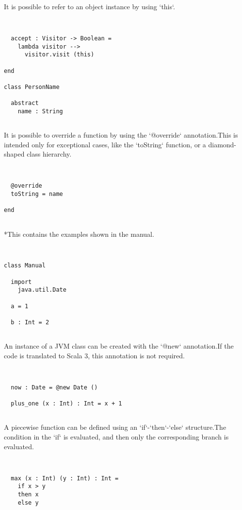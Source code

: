 \documentclass[12pt,a4paper]{article}
\begin{document}
It is possible to refer to an object instance by using `this`. 


\begin{lstlisting}


  accept : Visitor -> Boolean =
    lambda visitor -->
      visitor.visit (this)

end

class PersonName

  abstract
    name : String


\end{lstlisting}

It is possible to override a function by using the `@override` annotation.This is intended only for exceptional cases, like the `toString` function, or a diamond-shaped class hierarchy. 


\begin{lstlisting}


  @override
  toString = name

end


\end{lstlisting}

  *This contains the examples shown in the manual.


\begin{lstlisting}


class Manual

  import
    java.util.Date

  a = 1

  b : Int = 2


\end{lstlisting}

An instance of a JVM class can be created with the `@new` annotation.If the code is translated to Scala 3, this annotation is not required. 


\begin{lstlisting}


  now : Date = @new Date ()

  plus_one (x : Int) : Int = x + 1


\end{lstlisting}

A piecewise function can be defined using an `if`-`then`-`else` structure.The condition in the `if` is evaluated, and then only the corresponding branch is evaluated. 


\begin{lstlisting}


  max (x : Int) (y : Int) : Int =
    if x > y
    then x
    else y


\end{lstlisting}
\end{document}
